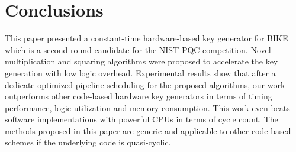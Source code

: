 \documentclass[runningheads]{llncs}
\begin{document}
\section{Conclusions}
This paper presented a constant-time hardware-based key generator for BIKE which is a second-round candidate for the NIST PQC competition. Novel multiplication and squaring algorithms were proposed to accelerate the key generation with low logic overhead. Experimental results show that after a dedicate optimized pipeline scheduling for the proposed algorithms, our work outperforms other code-based hardware key generators in terms of timing performance, logic utilization and memory consumption. This work even beats software implementations with powerful CPUs in terms of cycle count. The methods proposed in this paper are generic and applicable to other code-based schemes if the underlying code is quasi-cyclic.

%
%
%
% 
% 
%


\end{document}
